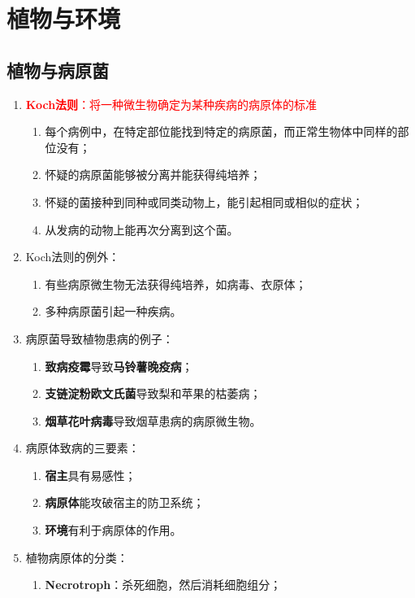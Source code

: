 \chapter{植物与环境}
\section{植物与病原菌}
\begin{enumerate}
    \item \textcolor{red}{\textbf{Koch法则}：将一种微生物确定为某种疾病的病原体的标准}
    \begin{enumerate}
        \item 每个病例中，在特定部位能找到特定的病原菌，而正常生物体中同样的部位没有；
        \item 怀疑的病原菌能够被分离并能获得纯培养；
        \item 怀疑的菌接种到同种或同类动物上，能引起相同或相似的症状；
        \item 从发病的动物上能再次分离到这个菌。
    \end{enumerate}
    \item Koch法则的例外：
    \begin{enumerate}
        \item 有些病原微生物无法获得纯培养，如病毒、衣原体；
        \item 多种病原菌引起一种疾病。
    \end{enumerate}
    \item 病原菌导致植物患病的例子：
    \begin{enumerate}
        \item \textbf{致病疫霉}导致\textbf{马铃薯晚疫病}；
        \item \textbf{支链淀粉欧文氏菌}导致梨和苹果的枯萎病；
        \item \textbf{烟草花叶病毒}导致烟草患病的病原微生物。
    \end{enumerate}
    \item 病原体致病的三要素：
    \begin{enumerate}
        \item \textbf{宿主}具有易感性；
        \item \textbf{病原体}能攻破宿主的防卫系统；
        \item \textbf{环境}有利于病原体的作用。
    \end{enumerate}
    \item 植物病原体的分类：
    \begin{enumerate}
        \item \textbf{Necrotroph}：杀死细胞，然后消耗细胞组分；

\end{enumerate}
\end{enumerate}
